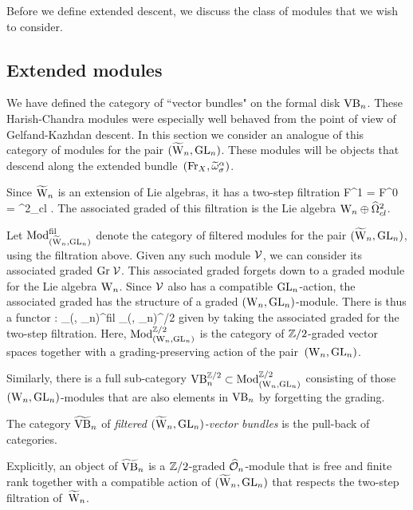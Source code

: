 Before we define extended descent, we discuss the class of modules that we wish to consider.

\subsection{Extended modules}

We have defined the category of ``vector bundles" on the formal disk ${\rm VB}_n$. 
These Harish-Chandra modules were especially well behaved from the point of view of Gelfand-Kazhdan descent. 
In this section we consider an analogue of this category of modules for the pair $(\widetilde{{{\rm W}}}_n, {\rm GL}_n)$. 
These modules will be objects that descend along the extended bundle~$({\rm Fr}_X, \widetilde{\omega}^\alpha_{\sigma})$. 

Since $\widetilde{{{\rm W}}}_n$ is an extension of Lie algebras, 
it has a two-step filtration 
\ben
F^1 \TVect = \TVect \supset F^0 \TVect = \hOmega^2_{cl} .
\een 
The associated graded of this filtration is the Lie algebra ${{\rm W}_n}
\oplus \widehat{\Omega}^2_{cl}$. 

Let ${\rm Mod}_{(\widetilde{{{\rm W}}}_n, {\rm GL}_n)}^{\rm fil}$ denote the category of filtered modules for the pair $(\widetilde{{{\rm W}}}_n,{\rm GL}_n)$, 
using the filtration above. 
Given any such module $\mathcal{V}$, we can consider its associated graded ${\rm Gr} \; \mathcal{V}$. 
This associated graded forgets down to a graded module for the Lie algebra ${{\rm W}_n}$. 
Since $\mathcal{V}$ also has a compatible ${\rm GL}_n$-action,
the associated graded has the structure of a graded $({{\rm W}_n}, {\rm GL}_n)$-module. 
There is thus a functor 
\ben
\Gr: \Mod_{(\TVect, \GL_n)}^{\rm fil} \to \Mod_{(\Vect, \GL_n)}^{\ZZ/2}
\een
given by taking the associated graded for the two-step filtration. 
Here, ${\rm Mod}_{({{\rm W}_n}, {\rm GL}_n)}^{\mathbb Z/2}$ is the category of $\mathbb Z/2$-graded vector spaces 
together with a grading-preserving action of the pair~$({{\rm W}_n}, {\rm GL}_n)$. 

Similarly, there is a full sub-category ${\rm VB}_n^{\mathbb Z/2} \subset {\rm Mod}_{({{\rm W}_n}, {\rm GL}_n)}^{\mathbb Z/2}$ 
consisting of those $({{\rm W}_n},{\rm GL}_n)$-modules that are also elements in ${\rm VB}_n$ by forgetting the grading. 

\begin{dfn} 
The category $\widetilde{{\rm VB}}_n$ of {\em filtered $(\widetilde{{{\rm W}}}_n, {\rm GL}_n)$-vector bundles} 
is the pull-back
\ben
{}
\een 
of categories.
\end{dfn}

Explicitly, an object of $\widetilde{{\rm VB}}_n$ is a $\mathbb Z/2$-graded $\widehat{\mathcal O}_n$-module 
that is free and finite rank together with a compatible action of $(\widetilde{{{\rm W}}}_n, {\rm GL}_n)$ that respects the two-step filtration of~$\widetilde{{{\rm W}}}_n$.

